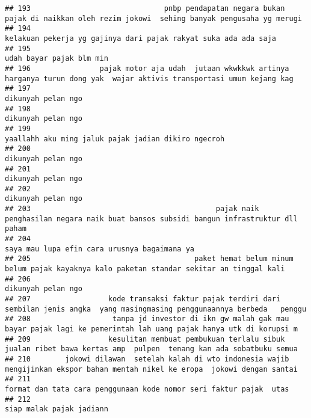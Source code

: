 \documentclass[
]{article}
\begin{document}
\begin{verbatim}
## 193                               pnbp pendapatan negara bukan pajak di naikkan oleh rezim jokowi  sehing banyak pengusaha yg merugi
## 194                                                                  kelakuan pekerja yg gajinya dari pajak rakyat suka ada ada saja
## 195                                                                                                         udah bayar pajak blm min
## 196                pajak motor aja udah  jutaan wkwkkwk artinya harganya turun dong yak  wajar aktivis transportasi umum kejang kag 
## 197                                                                                                         dikunyah pelan ngo      
## 198                                                                                                         dikunyah pelan ngo      
## 199                                                                             yaallahh aku ming jaluk pajak jadian dikiro ngecroh 
## 200                                                                                                         dikunyah pelan ngo      
## 201                                                                                                         dikunyah pelan ngo      
## 202                                                                                                         dikunyah pelan ngo      
## 203                                           pajak naik penghasilan negara naik buat bansos subsidi bangun infrastruktur dll paham 
## 204                                                                                     saya mau lupa efin cara urusnya bagaimana ya
## 205                                      paket hemat belum minum belum pajak kayaknya kalo paketan standar sekitar an tinggal kali  
## 206                                                                                                        dikunyah pelan ngo       
## 207                  kode transaksi faktur pajak terdiri dari sembilan jenis angka  yang masingmasing penggunaannya berbeda   penggu
## 208                   tanpa jd investor di ikn gw malah gak mau bayar pajak lagi ke pemerintah lah uang pajak hanya utk di korupsi m
## 209                  kesulitan membuat pembukuan terlalu sibuk jualan ribet bawa kertas amp  pulpen  tenang kan ada sobatbuku semua 
## 210        jokowi dilawan  setelah kalah di wto indonesia wajib mengijinkan ekspor bahan mentah nikel ke eropa  jokowi dengan santai
## 211                                                              format dan tata cara penggunaan kode nomor seri faktur pajak  utas 
## 212                                                                                                       siap malak pajak jadiann  

\end{verbatim}
\end{document}
